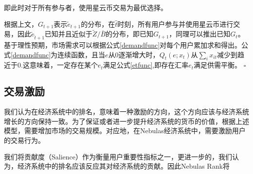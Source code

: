 即此时对于所有参与者，使用星云币交易为最优选择。

根据上文，$G_{t+1}$表示$\widetilde{e}_{t+1}$的分布，在$\hat{t}$时刻，所有用户参与并使用星云币进行交易，因此$\widetilde{e}_{\hat{t}+1}$已知并且近似于$\widetilde{Z}/\bar{B}$的分布，即已知$G_{t+1}$，同理可以推出已知$G_t$。基于理性预期，市场需求可以根据公式\eqref{demandfunc}对每个用户累加求和得出。公式\eqref{demandfunc}为连续函数，且当$e$从0逐渐增大时，$Q_t(e;x_t)$从$\sum_ix_{it}$减少到趋近于0.这意味着，一定存在某个$e_t$满足公式\eqref{etfunc},即存在汇率$e_t$满足供需平衡。
$\square$






\subsection{交易激励}

我们认为在经济系统中的排名，意味着一种激励的方向，这个方向应该与经济系统增长的方向保持一致。为了保证或者进一步提升经济系统的货币的价值，根据上述模型，需要增加市场的交易规模。对应地，在Nebulas经济系统中，需要激励用户的交易行为。

我们将贡献度（Salience）作为衡量用户重要性指标之一，更进一步的，我们认为，经济系统中的排名应该反应其对经济系统的贡献。因此Nebulas Rank将

